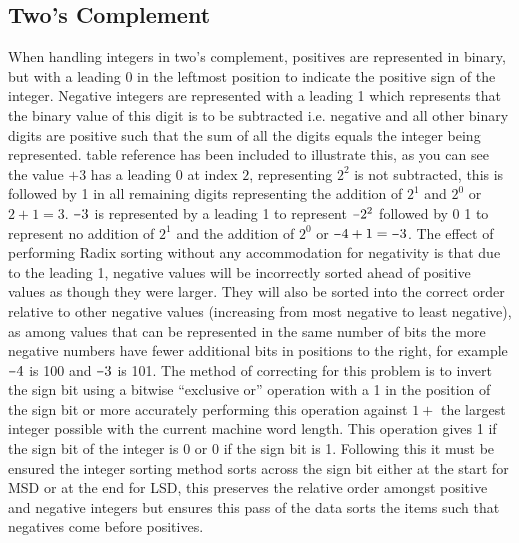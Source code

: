 \documentclass[12pt]{article}
\newcommand{\minus}{\scalebox{0.75}[1.0]{$-$}}
\begin{document}
	\subsection{Two's Complement}
	\label{ssec:negativestwos}
	When handling integers in two’s complement, positives are represented in binary, but with a leading 0 in the leftmost position to indicate the positive sign of the integer. Negative integers are represented with a leading 1 which represents that the binary value of this digit is to be subtracted i.e. negative and all other binary digits are positive such that the sum of all the digits equals the integer being represented. table reference has been included to illustrate this, as you can see the value $+3$ has a leading $0$ at index $2$, representing $2^{2}$ is not subtracted, this is followed by 1 in all remaining digits representing the addition of $2^{1}$ and $2^{0}$ or $2+1=3$. $\minus3$ is represented by a leading 1 to represent $\minus2^{2}$ followed by 0 1 to represent no addition of $2^{1}$ and the addition of $2^{0}$ or $\minus4 + 1 = \minus3$.
	\newline
	The effect of performing Radix sorting without any accommodation for negativity is that due to the leading 1, negative values will be incorrectly sorted ahead of positive values as though they were larger. They will also be sorted into the correct order relative to other negative values (increasing from most negative to least negative), as among values that can be represented in the same number of bits the more negative numbers have fewer additional bits in positions to the right, for example $\minus4$ is 100 and $\minus 3$ is 101.
	\newline
	The method of correcting for this problem is to invert the sign bit using a bitwise “exclusive or” operation with a 1 in the position of the sign bit or more accurately performing this operation against $1 +$ the largest integer possible with the current machine word length. This operation gives 1 if the sign bit of the integer is 0 or 0 if the sign bit is 1. Following this it must be ensured the integer sorting method sorts across the sign bit either at the start for MSD or at the end for LSD, this preserves the relative order amongst positive and negative integers but ensures this pass of the data sorts the items such that negatives come before positives.
\end{document}
